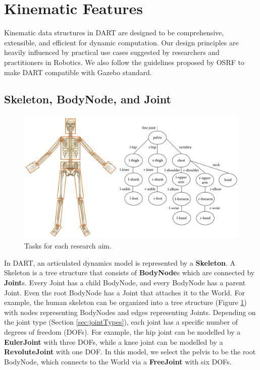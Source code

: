 \section{Kinematic Features}
Kinematic data structures in DART are designed to be comprehensive, extensible, and efficient for dynamic computation. Our design principles are heavily influenced by practical use cases suggested by researchers and practitioners in Robotics. We also follow the guidelines proposed by OSRF to make DART compatible with Gazebo standard.

\subsection{Skeleton, BodyNode, and Joint}
\begin{figure}
\centering
\includegraphics[width=6.0in]{skeletonTree.jpg}
\caption{Tasks for each research aim.}
\label{fig:skeleton}
\end{figure}
 In DART, an articulated dynamics model is represented by a \textbf{Skeleton}. A Skeleton is a tree structure that consists of \textbf{BodyNode}s which are connected by \textbf{Joint}s. Every Joint has a child BodyNode, and every BodyNode has a parent Joint. Even the root BodyNode has a Joint that attaches it to the World. For example, the human skeleton can be organized into a tree structure (Figure \ref{fig:skeleton}) with nodes representing BodyNodes and edges representing Joints. Depending on the joint type (Section \ref{sec:jointTypes}), each joint has a specific number of degrees of freedom (DOFs). For example, the hip joint can be modelled by a \textbf{EulerJoint} with three DOFs, while a knee joint can be modelled by a \textbf{RevoluteJoint} with one DOF. In this model, we select the pelvis to be the root BodyNode, which connects to the World via a \textbf{FreeJoint} with six DOFs.

